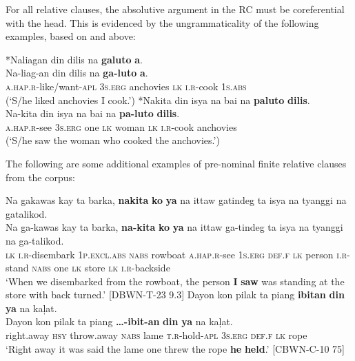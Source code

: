 For all relative clauses, the absolutive argument in the RC must be coreferential with the head. This is evidenced by the ungrammaticality of the following examples, based on  and  above:

\ea
*Naliagan  din  dilis  na  \textbf{galuto}  \textbf{a}. \smallskip\\
\gll *Na-liag-an  din  dilis  na  \textbf{ga-luto}  \textbf{a}. \\
\textsc{a.hap.r}-like/want-\textsc{apl}  3\textsc{s.erg}  anchovies  \textsc{lk}  \textsc{i.r}-cook  1\textsc{s.abs} \\
\glt (‘S/he liked anchovies I cook.’)
\z
\ea
*Nakita  din  isya  na  bai  na  \textbf{paluto}  \textbf{dilis}. \smallskip\\
\gll *Na-kita  din  isya  na  bai  na  \textbf{pa-luto}  \textbf{dilis}. \\
\textsc{a.hap.r}-see  3\textsc{s.erg}  one  \textsc{lk}  woman  \textsc{lk}  \textsc{i.r}-cook  anchovies \\
\glt (‘S/he saw the woman who cooked the anchovies.’)
\z

The following are some additional examples of pre-nominal finite relative clauses from the corpus:

\ea
Na  gakawas  kay  ta  barka,  \textbf{nakita}  \textbf{ko}  \textbf{ya} na  ittaw  gatindeg  ta  isya  na  tyanggi  na  gatalikod. \smallskip\\
\gll Na  ga-kawas  kay  ta  barka,  \textbf{na-kita}  \textbf{ko}  \textbf{ya} na  ittaw  ga-tindeg  ta  isya  na  tyanggi  na  ga-talikod. \\
\textsc{lk}  \textsc{i.r}-disembark  1\textsc{p.excl.abs}  \textsc{nabs}  rowboat  \textsc{a.hap.r}-see  1\textsc{s.erg}  \textsc{def.f}
\textsc{lk}  person  \textsc{i.r}-stand  \textsc{nabs}  one  \textsc{lk}  store  \textsc{lk}  \textsc{i.r}-backside \\
\glt `When we disembarked from the rowboat, the person \textbf{I} \textbf{saw} was standing at the store with back turned.’ [DBWN-T-23 9.3]
\z
\ea
Dayon  kon  pilak  ta  piang  \textbf{ibitan}  \textbf{din}  \textbf{ya}  na  kaļat. \smallskip\\
\gll Dayon  kon  pilak  ta  piang  \textbf{…-ibit-an}  \textbf{din}  \textbf{ya}  na  kaļat. \\
right.away  \textsc{hsy}  throw.away  \textsc{nabs}  lame  \textsc{t.r}-hold-\textsc{apl}  3\textsc{s.erg}  \textsc{def.f}  \textsc{lk}  rope \\
\glt ‘Right away it was said the lame one threw the rope \textbf{he} \textbf{held}.’ [CBWN-C-10 75]
\z

